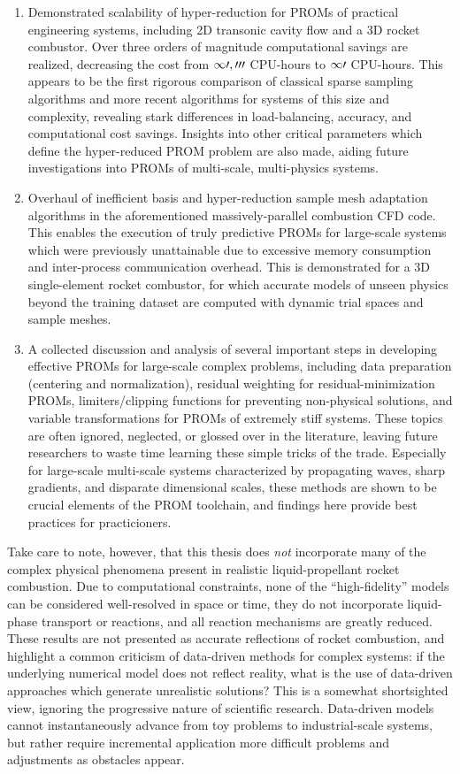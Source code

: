 \begin{enumerate}
    \item Demonstrated scalability of hyper-reduction for PROMs of practical engineering systems, including 2D transonic cavity flow and a 3D rocket combustor. Over three orders of magnitude computational savings are realized, decreasing the cost from $\mathcal{10,000}$ CPU-hours to $\mathcal{10}$ CPU-hours. This appears to be the first rigorous comparison of classical sparse sampling algorithms and more recent algorithms for systems of this size and complexity, revealing stark differences in load-balancing, accuracy, and computational cost savings. Insights into other critical parameters which define the hyper-reduced PROM problem are also made, aiding future investigations into PROMs of multi-scale, multi-physics systems.
    \item Overhaul of inefficient basis and hyper-reduction sample mesh adaptation algorithms in the aforementioned massively-parallel combustion CFD code. This enables the execution of truly predictive PROMs for large-scale systems which were previously unattainable due to excessive memory consumption and inter-process communication overhead. This is demonstrated for a 3D single-element rocket combustor, for which accurate models of unseen physics beyond the training dataset are computed with dynamic trial spaces and sample meshes.
    \item A collected discussion and analysis of several important steps in developing effective PROMs for large-scale complex problems, including data preparation (centering and normalization), residual weighting for residual-minimization PROMs, limiters/clipping functions for preventing non-physical solutions, and variable transformations for PROMs of extremely stiff systems. These topics are often ignored, neglected, or glossed over in the literature, leaving future researchers to waste time learning these simple tricks of the trade. Especially for large-scale multi-scale systems characterized by propagating waves, sharp gradients, and disparate dimensional scales, these methods are shown to be crucial elements of the PROM toolchain, and findings here provide best practices for practicioners. 
\end{enumerate}

Take care to note, however, that this thesis does \textit{not} incorporate many of the complex physical phenomena present in realistic liquid-propellant rocket combustion. Due to computational constraints, none of the ``high-fidelity'' models can be considered well-resolved in space or time, they do not incorporate liquid-phase transport or reactions, and all reaction mechanisms are greatly reduced. These results are not presented as accurate reflections of rocket combustion, and highlight a common criticism of data-driven methods for complex systems: if the underlying numerical model does not reflect reality, what is the use of data-driven approaches which generate unrealistic solutions? This is a somewhat shortsighted view, ignoring the progressive nature of scientific research. Data-driven models cannot instantaneously advance from toy problems to industrial-scale systems, but rather require incremental application more difficult problems and adjustments as obstacles appear. 

